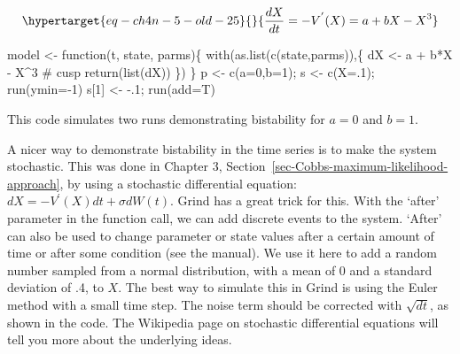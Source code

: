 \documentclass[
  a4paper,
  DIV=11,
  numbers=noendperiod,
  oneside]{scrreprt}
\newenvironment{Shaded}{\begin{snugshade}}{\end{snugshade}}
\newcommand{\AttributeTok}[1]{\textcolor[rgb]{0.40,0.45,0.13}{#1}}
\newcommand{\CommentTok}[1]{\textcolor[rgb]{0.37,0.37,0.37}{#1}}
\newcommand{\ControlFlowTok}[1]{\textcolor[rgb]{0.00,0.23,0.31}{#1}}
\newcommand{\DecValTok}[1]{\textcolor[rgb]{0.68,0.00,0.00}{#1}}
\newcommand{\FunctionTok}[1]{\textcolor[rgb]{0.28,0.35,0.67}{#1}}
\newcommand{\NormalTok}[1]{\textcolor[rgb]{0.00,0.23,0.31}{#1}}
\newcommand{\OtherTok}[1]{\textcolor[rgb]{0.00,0.23,0.31}{#1}}
\newcommand{\SpecialCharTok}[1]{\textcolor[rgb]{0.37,0.37,0.37}{#1}}
\begin{document}
\begin{equation}\protect\hypertarget{eq-ch4n-5-old-25}{}{
\frac{dX}{dt} = - V^{'}(X) = {a + bX - X}^{3}
}\label{eq-ch4n-5-old-25}\end{equation}

\begin{Shaded}
\begin{Highlighting}[]
\NormalTok{model }\OtherTok{\textless{}{-}} \ControlFlowTok{function}\NormalTok{(t, state, parms)\{}
  \FunctionTok{with}\NormalTok{(}\FunctionTok{as.list}\NormalTok{(}\FunctionTok{c}\NormalTok{(state,parms)),\{}
\NormalTok{    dX }\OtherTok{\textless{}{-}}\NormalTok{  a }\SpecialCharTok{+}\NormalTok{ b}\SpecialCharTok{*}\NormalTok{X }\SpecialCharTok{{-}}\NormalTok{ X}\SpecialCharTok{\^{}}\DecValTok{3}        \CommentTok{\# cusp}
    \FunctionTok{return}\NormalTok{(}\FunctionTok{list}\NormalTok{(dX))}
\NormalTok{  \})}
\NormalTok{\}}
\NormalTok{p }\OtherTok{\textless{}{-}} \FunctionTok{c}\NormalTok{(}\AttributeTok{a=}\DecValTok{0}\NormalTok{,}\AttributeTok{b=}\DecValTok{1}\NormalTok{); s }\OtherTok{\textless{}{-}} \FunctionTok{c}\NormalTok{(}\AttributeTok{X=}\NormalTok{.}\DecValTok{1}\NormalTok{); }\FunctionTok{run}\NormalTok{(}\AttributeTok{ymin=}\SpecialCharTok{{-}}\DecValTok{1}\NormalTok{)}
\NormalTok{s[}\DecValTok{1}\NormalTok{] }\OtherTok{\textless{}{-}} \SpecialCharTok{{-}}\NormalTok{.}\DecValTok{1}\NormalTok{; }\FunctionTok{run}\NormalTok{(}\AttributeTok{add=}\NormalTok{T)}
\end{Highlighting}
\end{Shaded}

This code simulates two runs demonstrating bistability for \(a = 0\) and
\(b = 1\).

A nicer way to demonstrate bistability in the time series is to make the
system stochastic. This was done in Chapter 3,
Section~\ref{sec-Cobbs-maximum-likelihood-approach}, by using a
stochastic differential equation: \(dX = - V^{'}(X)dt + \sigma dW(t)\).
Grind has a great trick for this. With the `after' parameter in the
function call, we can add discrete events to the system. `After' can
also be used to change parameter or state values after a certain amount
of time or after some condition (see the manual). We use it here to add
a random number sampled from a normal distribution, with a mean of 0 and
a standard deviation of .4, to \(X\). The best way to simulate this in
Grind is using the Euler method with a small time step. The noise term
should be corrected with \(\sqrt{dt}\), as shown in the code. The
Wikipedia page on stochastic differential equations will tell you more
about the underlying ideas.
\end{document}
